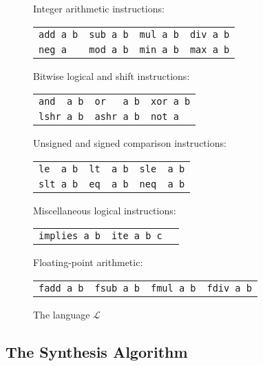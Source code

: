 \documentclass[preprint]{sigplanconf}
\theoremstyle{definition}
\begin{document}
\begin{figure}
\begin{center}
{\small

\setlength{\tabcolsep}{14pt}
Integer arithmetic instructions:

\begin{tabular}{llll}
 \verb|add a b| & \verb|sub a b| & \verb|mul a b| & \verb|div a b| \\
 \verb|neg a| &   \verb|mod a b| & \verb|min a b| & \verb|max a b|
\end{tabular}

\medskip

Bitwise logical and shift instructions:

\begin{tabular}{lll}
 \verb|and  a b| & \verb|or   a b| & \verb|xor a b| \\
 \verb|lshr a b| & \verb|ashr a b| & \verb|not a|
\end{tabular}

\medskip

Unsigned and signed comparison instructions:

\begin{tabular}{lll}
 \verb|le  a b| & \verb|lt  a b| & \verb|sle  a b| \\
 \verb|slt a b| & \verb|eq  a b| & \verb|neq  a b| \\
\end{tabular}

\medskip

Miscellaneous logical instructions:

\begin{tabular}{lll}
 \verb|implies a b| & \verb|ite a b c| &  \\
\end{tabular}

\medskip

\setlength{\tabcolsep}{12pt}

Floating-point arithmetic:

\begin{tabular}{llll}
 \verb|fadd a b| & \verb|fsub a b| & \verb|fmul a b| & \verb|fdiv a b|
\end{tabular}

}
\end{center}

 \caption{The language $\mathcal{L}$}
 \label{fig:l-language}
\end{figure}

\subsection{The Synthesis Algorithm}
\end{document}
